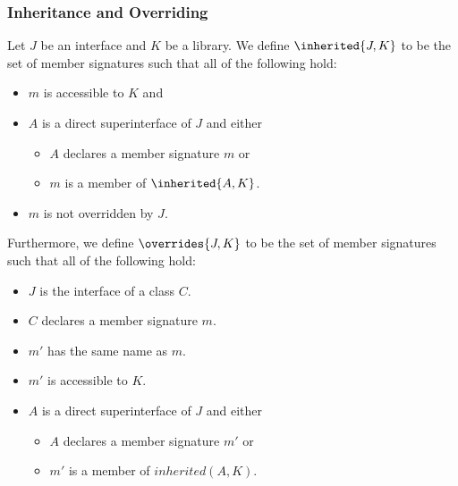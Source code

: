 \documentclass[makeidx]{article}
\begin{document}


\subsubsection{Inheritance and Overriding}

\LMHash{}%
%
Let $J$ be an interface and $K$ be a library.
We define $\inherited{J, K}$ to be the set of member signatures
such that all of the following hold:

\begin{itemize}
\item $m$ is accessible to $K$ and
\item $A$ is a direct superinterface of $J$ and either
  \begin{itemize}
  \item $A$ declares a member signature $m$ or
  \item $m$ is a member of $\inherited{A, K}$.
  \end{itemize}
\item $m$ is not overridden by $J$.
\end{itemize}

\LMHash{}%
Furthermore, we define $\overrides{J, K}$ to be
the set of member signatures 
such that all of the following hold:

\begin{itemize}
\item $J$ is the interface of a class $C$.
\item $C$ declares a member signature $m$.
\item $m'$ has the same name as $m$.
\item $m'$ is accessible to $K$.
\item $A$ is a direct superinterface of $J$ and either
  \begin{itemize}
  \item $A$ declares a member signature $m'$ or
  \item $m'$ is a member of $inherited(A, K)$.
  \end{itemize}
\end{itemize}
\end{document}
